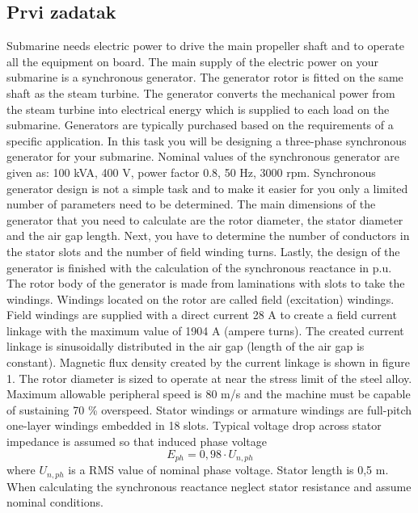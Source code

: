 \documentclass[a4paper]{article}
\begin{document}
\subsection{Prvi zadatak}
Submarine needs electric power to drive the main propeller shaft and to operate all the equipment on board. The main supply of the electric power on your submarine is a synchronous generator. The generator rotor is fitted on the same shaft as the steam turbine. The generator converts the mechanical power from the steam turbine into electrical energy which is supplied to each load on the submarine. Generators are typically purchased based on the requirements of a specific application. In this task you will be designing a three-phase synchronous generator for your submarine. Nominal values of the synchronous generator are given as: 100 kVA, 400 V, power factor 0.8, 50 Hz, 3000 rpm.
Synchronous generator design is not a simple task and to make it easier for you only a limited  number of parameters need to be determined. The main dimensions of the generator that you need to calculate are the rotor diameter, the stator diameter and the air gap length. Next, you have to determine the number of conductors in the stator slots and the number of field winding turns. Lastly, the design of the generator is finished with the calculation of the synchronous reactance in p.u. 
The rotor body of the generator is made from laminations with slots to take the windings. Windings located on the rotor are called field (excitation) windings. Field windings are supplied with a direct current 28 A to create a field current linkage with the maximum value of 1904 A (ampere turns). The created current linkage is sinusoidally distributed in the air gap (length of the air gap is constant). Magnetic flux density created by the current linkage is shown in figure 1. The rotor diameter is sized to operate at near the stress limit of the steel alloy. Maximum allowable peripheral speed is 80 m/s and the machine must be capable of sustaining 70 \% overspeed. 
Stator windings or armature windings are full-pitch one-layer windings embedded in 18 slots. Typical voltage drop across stator impedance is assumed so that induced phase voltage \[E_{ph} = 0,98 \cdot U_{n,ph}\] where $U_{n,ph}$ is a RMS value of nominal phase voltage. Stator length is 0,5 m. When calculating the synchronous reactance neglect stator resistance and assume nominal conditions.
\end{document}
